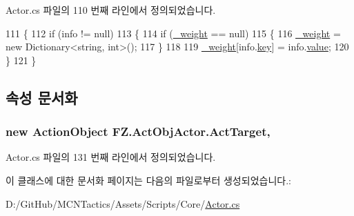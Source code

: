 Actor.\+cs 파일의 110 번째 라인에서 정의되었습니다.


\begin{DoxyCode}
111         \{
112             \textcolor{keywordflow}{if} (info != null)
113             \{
114                 \textcolor{keywordflow}{if} (\hyperlink{class_f_z_1_1_actor_a58087c82d2172b1edc4d6d7ec0786317}{\_weight} == null)
115                 \{
116                     \hyperlink{class_f_z_1_1_actor_a58087c82d2172b1edc4d6d7ec0786317}{\_weight} = \textcolor{keyword}{new} Dictionary<string, int>();
117                 \}
118 
119                 \hyperlink{class_f_z_1_1_actor_a58087c82d2172b1edc4d6d7ec0786317}{\_weight}[info.\hyperlink{class_f_z_1_1_pair_a36d4b7c90f0a247dff54da733701a53a}{key}] = info.\hyperlink{class_f_z_1_1_pair_a548bd4cfb4d1587016f1f53be6fac5b8}{value};
120             \}
121         \}
\end{DoxyCode}


\subsection{속성 문서화}
\subsubsection[{\texorpdfstring{Act\+Target}{ActTarget}}]{\setlength{\rightskip}{0pt plus 5cm}new {\bf Action\+Object} F\+Z.\+Act\+Obj\+Actor.\+Act\+Target\hspace{0.3cm}{\ttfamily [get]}, {\ttfamily [protected]}}\hypertarget{class_f_z_1_1_act_obj_actor_abb12c3b4970b1e028a57e16f04065944}{}\label{class_f_z_1_1_act_obj_actor_abb12c3b4970b1e028a57e16f04065944}


Actor.\+cs 파일의 131 번째 라인에서 정의되었습니다.



이 클래스에 대한 문서화 페이지는 다음의 파일로부터 생성되었습니다.\+:\begin{DoxyCompactItemize}
\item 
D\+:/\+Git\+Hub/\+M\+C\+N\+Tactics/\+Assets/\+Scripts/\+Core/\hyperlink{_actor_8cs}{Actor.\+cs}\end{DoxyCompactItemize}
